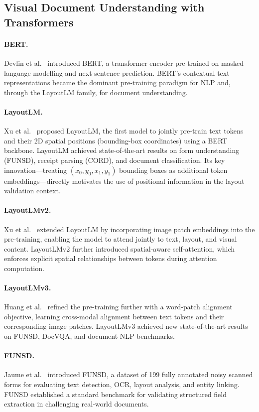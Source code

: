 \subsection{Visual Document Understanding with Transformers}
\label{ssec:vdu}

\paragraph{BERT.}
Devlin et al.~\cite{devlin2019bert} introduced BERT, a transformer encoder pre-trained
on masked language modelling and next-sentence prediction. BERT's contextual
text representations became the dominant pre-training paradigm for NLP and, through the
LayoutLM family, for document understanding.

\paragraph{LayoutLM.}
Xu et al.~\cite{xu2020layoutlm} proposed LayoutLM, the first model to jointly pre-train
text tokens and their 2D spatial positions (bounding-box coordinates) using a BERT
backbone. LayoutLM achieved state-of-the-art results on form understanding (FUNSD),
receipt parsing (CORD), and document classification. Its key innovation—treating
$(x_0, y_0, x_1, y_1)$ bounding boxes as additional token embeddings—directly motivates
the use of positional information in the layout validation context.

\paragraph{LayoutLMv2.}
Xu et al.~\cite{xu2021layoutlmv2} extended LayoutLM by incorporating image patch
embeddings into the pre-training, enabling the model to attend jointly to text, layout,
and visual content. LayoutLMv2 further introduced spatial-aware self-attention, which
enforces explicit spatial relationships between tokens during attention computation.

\paragraph{LayoutLMv3.}
Huang et al.~\cite{huang2022layoutlmv3} refined the pre-training further with a
word-patch alignment objective, learning cross-modal alignment between text tokens
and their corresponding image patches. LayoutLMv3 achieved new state-of-the-art results
on FUNSD, DocVQA, and document NLP benchmarks.

\paragraph{FUNSD.}
Jaume et al.~\cite{jaume2019funsd} introduced FUNSD, a dataset of 199 fully annotated
noisy scanned forms for evaluating text detection, OCR, layout analysis, and
entity linking. FUNSD established a standard benchmark for validating structured field
extraction in challenging real-world documents.

